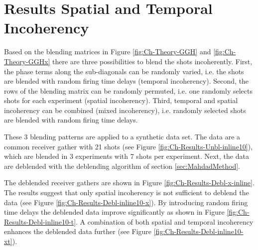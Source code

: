 \FloatBarrier

\section{Results Spatial and Temporal Incoherency}

Based on the blending matrices in Figure \ref{fig:Ch-Theory-GGH} and \ref{fig:Ch-Theory-GGHx} there are three possibilities to blend the shots incoherently. First, the phase terms along the sub-diagonals can be randomly varied, i.e. the shots are blended with random firing time delays (temporal incoherency). Second, the rows of the blending matrix can be randomly permuted, i.e. one randomly selects shots for each experiment (spatial incoherency). Third, temporal and spatial incoherency can be combined (mixed incoherency), i.e. randomly selected shots are blended with random firing time delays.

These 3 blending patterns are applied to a synthetic data set. The data are a common receiver gather with 21 shots (see Figure \ref{fig:Ch-Results-Unbl-inline10}), which are blended in 3 experiments with 7 shots per experiment. Next, the data are deblended with the deblending algorithm of section \ref{sec:MahdadMethod}. 

The deblended receiver gathers  are shown in Figure \ref{fig:Ch-Results-Debl-x-inline}. The results suggest that only spatial incoherency is not sufficient to deblend the data (see Figure \ref{fig:Ch-Results-Debl-inline10-x}). By introducing random firing time delays the deblended data improve significantly as shown in Figure \ref{fig:Ch-Results-Debl-inline10-t}. A combination of both spatial and temporal incoherency enhances the deblended data further (see Figure \ref{fig:Ch-Results-Debl-inline10-xt}).


